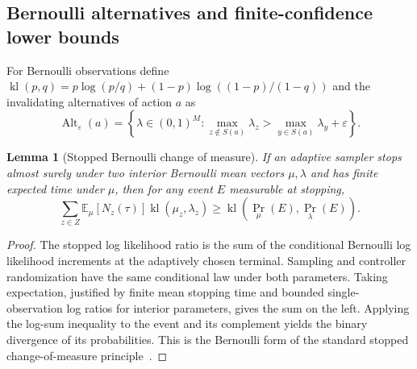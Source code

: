\documentclass{article}
\theoremstyle{plain}
\newtheorem{lemma}[theorem]{Lemma}
\theoremstyle{definition}
\begin{document}
\subsection{Bernoulli alternatives and finite-confidence lower bounds}
\label{app:bernoulli-alternatives}

For Bernoulli observations define
$\operatorname{kl}(p,q)=p\log(p/q)+(1-p)\log((1-p)/(1-q))$ and the invalidating alternatives of action $a$ as
\begin{equation}
 \operatorname{Alt}_\varepsilon(a)=
 \left\{\lambda\in(0,1)^M:\max_{z\notin S(a)}\lambda_z>
 \max_{y\in S(a)}\lambda_y+\varepsilon\right\}.
 \label{eq:active-alt}
\end{equation}
\begin{lemma}[Stopped Bernoulli change of measure]\label{lem:active-com}
If an adaptive sampler stops almost surely under two interior Bernoulli mean vectors $\mu,\lambda$ and has finite expected time under $\mu$, then for any event $E$ measurable at stopping,
\[
 \sum_{z\in Z}\mathbb E_\mu[N_z(\tau)]\operatorname{kl}(\mu_z,\lambda_z)
 \ge\operatorname{kl}(\Pr_\mu(E),\Pr_\lambda(E)).
\]
\end{lemma}
\begin{proof}
The stopped log likelihood ratio is the sum of the conditional Bernoulli log likelihood increments at the adaptively chosen terminal. Sampling and controller randomization have the same conditional law under both parameters. Taking expectation, justified by finite mean stopping time and bounded single-observation log ratios for interior parameters, gives the sum on the left. Applying the log-sum inequality to the event and its complement yields the binary divergence of its probabilities. This is the Bernoulli form of the standard stopped change-of-measure principle~\citep{kaufmannkl}.
\end{proof}
\end{document}
